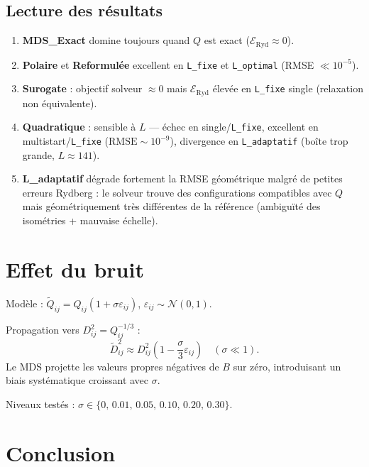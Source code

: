 \documentclass[12pt,a4paper]{article}
\begin{document}
\subsection{Lecture des résultats}

\begin{enumerate}[leftmargin=2em]
  \item \textbf{MDS\_Exact} domine toujours quand $Q$ est exact
    ($\mathcal{E}_{\mathrm{Ryd}}\approx 0$).
  \item \textbf{Polaire} et \textbf{Reformulée} excellent en \texttt{L\_fixe}
    et \texttt{L\_optimal} (RMSE $\ll 10^{-5}$).
  \item \textbf{Surogate} : objectif solveur $\approx 0$ mais
    $\mathcal{E}_{\mathrm{Ryd}}$ élevée en \texttt{L\_fixe} single
    (relaxation non équivalente).
  \item \textbf{Quadratique} : sensible à $L$ --- échec en single/\texttt{L\_fixe},
    excellent en multistart/\texttt{L\_fixe} ($\mathrm{RMSE}\sim 10^{-9}$),
    divergence en \texttt{L\_adaptatif} (boîte trop grande, $L\approx 141$).
  \item \textbf{L\_adaptatif} dégrade fortement la RMSE géométrique
    malgré de petites erreurs Rydberg : le solveur trouve des configurations
    compatibles avec $Q$ mais géométriquement très différentes de la référence
    (ambiguïté des isométries + mauvaise échelle).
\end{enumerate}

\section{Effet du bruit}

Modèle : $\tilde{Q}_{ij} = Q_{ij}(1+\sigma\varepsilon_{ij})$,
$\varepsilon_{ij}\sim\mathcal{N}(0,1)$.

Propagation vers $D^2_{ij} = Q_{ij}^{-1/3}$ :
\[
  \tilde{D}^2_{ij} \approx D^2_{ij}\left(1-\frac{\sigma}{3}\varepsilon_{ij}\right)
  \quad(\sigma\ll 1).
\]
Le MDS projette les valeurs propres négatives de $B$ sur zéro,
introduisant un biais systématique croissant avec $\sigma$.

Niveaux testés : $\sigma \in \{0,\,0.01,\,0.05,\,0.10,\,0.20,\,0.30\}$.

\section{Conclusion}
\end{document}
